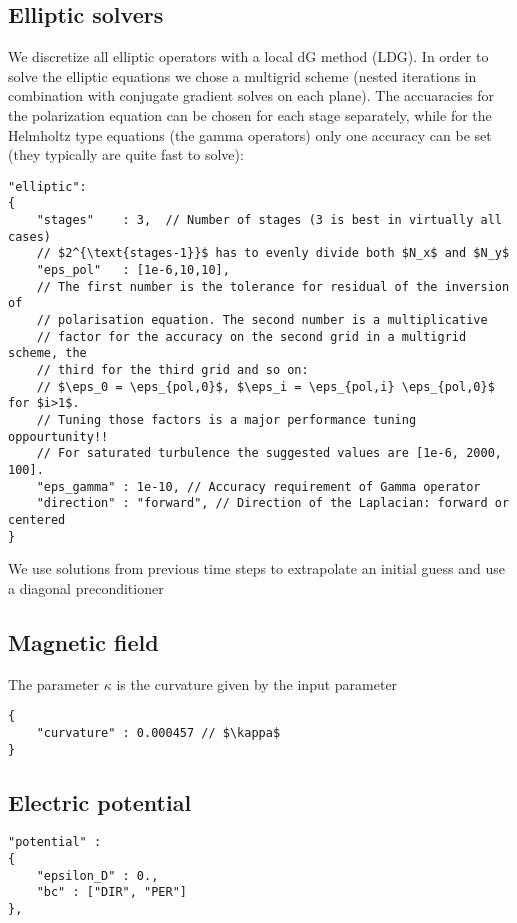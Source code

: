 \subsection{Elliptic solvers}
We discretize all elliptic operators with a local dG method (LDG).  In order to
solve the elliptic equations we chose a multigrid scheme (nested iterations in
combination with conjugate gradient solves on each plane). The accuaracies for
the polarization equation can be chosen for each stage separately, while for
the Helmholtz type equations (the gamma operators) only
one accuracy can be set (they typically are quite fast to solve):
\begin{verbatim}
"elliptic":
{
    "stages"    : 3,  // Number of stages (3 is best in virtually all cases)
    // $2^{\text{stages-1}}$ has to evenly divide both $N_x$ and $N_y$
    "eps_pol"   : [1e-6,10,10],
    // The first number is the tolerance for residual of the inversion of
    // polarisation equation. The second number is a multiplicative
    // factor for the accuracy on the second grid in a multigrid scheme, the
    // third for the third grid and so on:
    // $\eps_0 = \eps_{pol,0}$, $\eps_i = \eps_{pol,i} \eps_{pol,0}$  for $i>1$.
    // Tuning those factors is a major performance tuning oppourtunity!!
    // For saturated turbulence the suggested values are [1e-6, 2000, 100].
    "eps_gamma" : 1e-10, // Accuracy requirement of Gamma operator
    "direction" : "forward", // Direction of the Laplacian: forward or centered
}
\end{verbatim}
\begin{tcolorbox}[title=Note]
    We use solutions from previous time steps to extrapolate an initial guess
    and use a diagonal preconditioner
\end{tcolorbox}
\subsection{Magnetic field}
The parameter $\kappa$ is the curvature given by the input parameter
\begin{verbatim}
{
    "curvature" : 0.000457 // $\kappa$
}
\end{verbatim}
\subsection{Electric potential}
\begin{verbatim}
"potential" :
{
    "epsilon_D" : 0.,
    "bc" : ["DIR", "PER"]
},
\end{verbatim}

